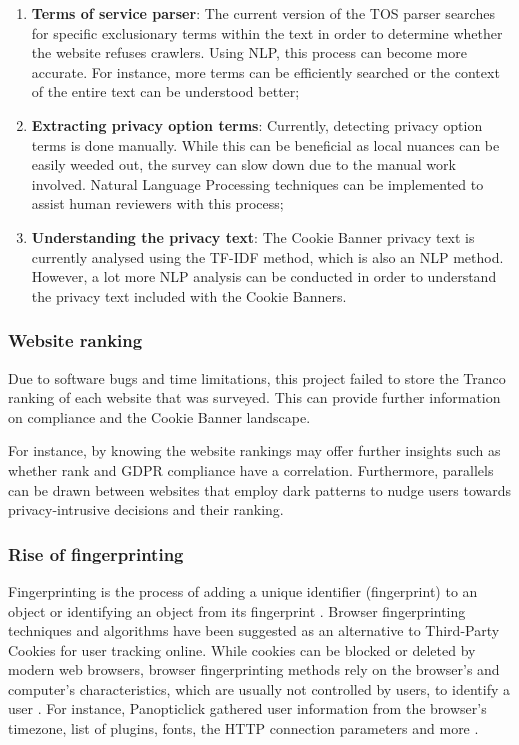 \documentclass[../main.tex]{subfiles}
\begin{document}
\begin{enumerate}
    \item \textbf{Terms of service parser}: The current version of the TOS parser searches for specific exclusionary terms within the text in order to determine whether the website refuses crawlers. Using NLP, this process can become more accurate. For instance, more terms can be efficiently searched or the context of the entire text can be understood better;

    \item \textbf{Extracting privacy option terms}: Currently, detecting privacy option terms is done manually. While this can be beneficial as local nuances can be easily weeded out, the survey can slow down due to the manual work involved. Natural Language Processing techniques can be implemented to assist human reviewers with this process;

    \item \textbf{Understanding the privacy text}: The Cookie Banner privacy text is currently analysed using the TF-IDF method, which is also an NLP method. However, a lot more NLP analysis can be conducted in order to understand the privacy text included with the Cookie Banners. 
\end{enumerate}

\subsubsection{Website ranking}
Due to software bugs and time limitations, this project failed to store the Tranco ranking of each website that was surveyed. This can provide further information on compliance and the Cookie Banner landscape.

For instance, by knowing the website rankings may offer further insights such as whether rank and GDPR compliance have a correlation. Furthermore, parallels can be drawn between websites that employ dark patterns to nudge users towards privacy-intrusive decisions and their ranking.

\subsubsection{Rise of fingerprinting}
Fingerprinting is the process of adding a unique identifier (fingerprint) to an object or identifying an object from its fingerprint \cite{wagner1983fingerprinting}. Browser fingerprinting techniques and algorithms have been suggested as an alternative to Third-Party Cookies for user tracking online. While cookies can be blocked or deleted by modern web browsers, browser fingerprinting methods rely on the browser’s and computer’s characteristics, which are usually not controlled by users, to identify a user \cite{boda2011user}. For instance, Panopticlick gathered user information from the browser’s timezone, list of plugins, fonts, the HTTP connection parameters and more \cite{eckersley2010unique}.
\end{document}
